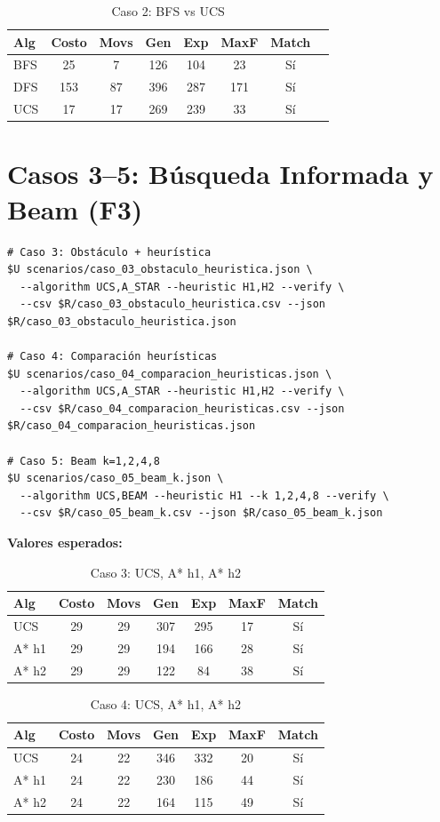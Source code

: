 \begin{table}[H]
\centering
\caption{Caso 2: BFS vs UCS}
\begin{tabular}{lccccccc}
\toprule
Alg & Costo & Movs & Gen & Exp & MaxF & Match \\
\midrule
BFS & 25 & 7 & 126 & 104 & 23 & Sí \\
DFS & 153 & 87 & 396 & 287 & 171 & Sí \\
UCS & 17 & 17 & 269 & 239 & 33 & Sí \\
\bottomrule
\end{tabular}
\end{table}

\section{Casos 3--5: Búsqueda Informada y Beam (F3)}
\label{sec:rep-f3}

\begin{verbatim}
# Caso 3: Obstáculo + heurística
$U scenarios/caso_03_obstaculo_heuristica.json \
  --algorithm UCS,A_STAR --heuristic H1,H2 --verify \
  --csv $R/caso_03_obstaculo_heuristica.csv --json $R/caso_03_obstaculo_heuristica.json

# Caso 4: Comparación heurísticas
$U scenarios/caso_04_comparacion_heuristicas.json \
  --algorithm UCS,A_STAR --heuristic H1,H2 --verify \
  --csv $R/caso_04_comparacion_heuristicas.csv --json $R/caso_04_comparacion_heuristicas.json

# Caso 5: Beam k=1,2,4,8
$U scenarios/caso_05_beam_k.json \
  --algorithm UCS,BEAM --heuristic H1 --k 1,2,4,8 --verify \
  --csv $R/caso_05_beam_k.csv --json $R/caso_05_beam_k.json
\end{verbatim}

\textbf{Valores esperados:}

\begin{table}[H]
\centering
\caption{Caso 3: UCS, A* h1, A* h2}
\begin{tabular}{lcccccc}
\toprule
Alg & Costo & Movs & Gen & Exp & MaxF & Match \\
\midrule
UCS & 29 & 29 & 307 & 295 & 17 & Sí \\
A* h1 & 29 & 29 & 194 & 166 & 28 & Sí \\
A* h2 & 29 & 29 & 122 & 84 & 38 & Sí \\
\bottomrule
\end{tabular}
\end{table}

\begin{table}[H]
\centering
\caption{Caso 4: UCS, A* h1, A* h2}
\begin{tabular}{lcccccc}
\toprule
Alg & Costo & Movs & Gen & Exp & MaxF & Match \\
\midrule
UCS & 24 & 22 & 346 & 332 & 20 & Sí \\
A* h1 & 24 & 22 & 230 & 186 & 44 & Sí \\
A* h2 & 24 & 22 & 164 & 115 & 49 & Sí \\
\bottomrule
\end{tabular}
\end{table}

